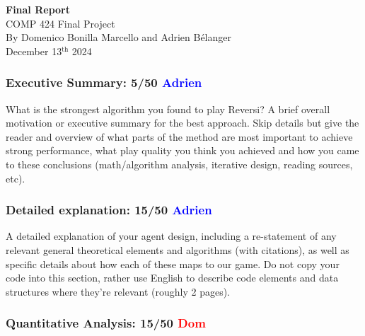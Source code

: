 \documentclass[12pt, letterpaper]{article}
\begin{document}
\begin{titlepage}
    \centering
    \vspace*{2in}
    {\LARGE \textbf{Final Report}}\\
    \vspace*{0.5in}
    {\large COMP 424 Final Project}\\[4in]
    \normalsize
    By Domenico Bonilla Marcello and Adrien Bélanger\\ [3em]
    December 13$^{\text{th}}$ 2024
\end{titlepage}

\subsubsection*{Executive Summary: 5/50 \textcolor{blue}{Adrien}}
    
    What is the strongest algorithm you found to play Reversi? 
    A brief overall motivation or executive summary for the best approach. 
    Skip details but give the reader and overview of what parts of 
    the method are most important to achieve strong performance, 
    what play quality you think you achieved and how you came to 
    these conclusions (math/algorithm analysis, iterative design, 
    reading sources, etc).
    



\subsubsection*{Detailed explanation: 15/50 \textcolor{blue}{Adrien}}
    
    A detailed explanation of your agent design, including a re-statement of any relevant general 
    theoretical elements and algorithms (with citations), as well as specific details about
    how each of these maps to our game. Do not copy your code into this section, 
    rather use English to describe code elements and data structures where they're 
    relevant  (roughly 2 pages).
    

\subsubsection*{Quantitative Analysis: 15/50 \textcolor{red}{Dom}}
    
\end{document}
